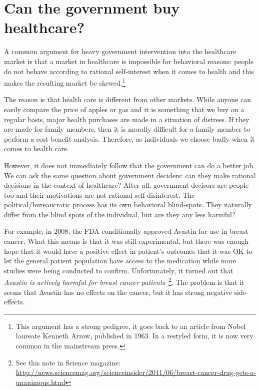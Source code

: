 \section{Can the government buy healthcare?}

A common argument for heavy government intervention into the healthcare market
is that a market in healthcare is impossible for behavioral reasons: people do
not behave according to rational self-interest when it comes to health and this
makes the resulting market be skewed.\footnote{This argument has a strong
pedigree, it goes back to an article from Nobel laureate Kenneth Arrow,
published in 1963. In a restyled form, it is now very common in the mainstream
press.}

The reason is that health care is different from other markets. While anyone
can easily compare the price of apples or gas and it is something that we buy
on a regular basis, major health purchases are made in a situation of distress.
If they are made for family members, then it is morally difficult for a family
member to perform a cost-benefit analysis. Therefore, as individuals we choose
badly when it comes to health care.

However, it does not immediately follow that the government can do a better
job. We can ask the same question about government deciders: can they make
rational decisions in the context of healthcare? After all, government decisors
are people too and their motivations are not rational self-disinterest. The
political/bureaucratic process has its own behavioral blind-spots. They
naturally differ from the blind spots of the individual, but are they any less
harmful?

For example, in 2008, the FDA conditionally approved Avastin for use in breast
cancer. What this means is that it was still experimental, but there was enough
hope that it would have a positive effect in patient's outcomes that it was OK
to let the general patient population have access to the medication while more
studies were being conducted to confirm. Unfortunately, it turned out that
\emph{Avastin is actively harmful for breast cancer
patients}~\cite{avastin-harfmul}\footnote{See this note in Science magazine:
\url{http://news.sciencemag.org/scienceinsider/2011/06/breast-cancer-drug-gets-a-unanimous.html}}.
The problem is that it seems that Avastin has no effects on the cancer, but it
has strong negative side-effects.

